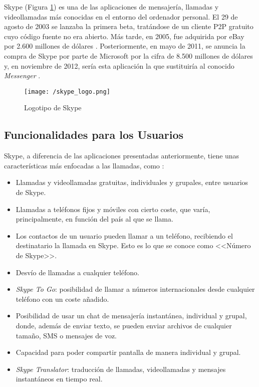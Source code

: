 Skype (Figura \ref{fig:skype}) es una de las aplicaciones de mensajería, llamadas y videollamadas más conocidas en el entorno del ordenador personal.
El 29 de agosto de 2003 se lanzaba la primera beta, tratándose de un cliente \acf{P2P} gratuito cuyo código fuente no era abierto. Más tarde, en 2005, fue adquirida por eBay por 2.600 millones de dólares \cite{Velasco2013}. Posteriormente, en mayo de 2011, se anuncia la compra de Skype por parte de Microsoft por la cifra de 8.500 millones de dólares y, en noviembre de 2012, sería esta aplicación la que sustituiría al conocido \textit{Messenger} \cite{Ramirez2013}.

\begin{figure}[!h]
	\begin{center}
		\texttt{[image: /skype\_logo.png]}
		\caption{Logotipo de Skype}
		\label{fig:skype}
	\end{center}
\end{figure}

\subsection{Funcionalidades para los Usuarios}
Skype, a diferencia de las aplicaciones presentadas anteriormente, tiene unas características más enfocadas a las llamadas, como \cite{Skype2017}:

\begin{itemize}
	\item Llamadas y videollamadas gratuitas, individuales y grupales, entre usuarios de Skype.
	\item Llamadas a teléfonos fijos y móviles con cierto coste, que varía, principalmente, en función del país al que se llama.
	\item Los contactos de un usuario pueden llamar a un teléfono, recibiendo el destinatario la llamada en Skype. Esto es lo que se conoce como <<Número de Skype>>.
	\item Desvío de llamadas a cualquier teléfono.
	\item \textit{Skype To Go}: posibilidad de llamar a números internacionales desde cualquier teléfono con un coste añadido.
	\item Posibilidad de usar un chat de mensajería instantánea, individual y grupal, donde, además de enviar texto, se pueden enviar archivos de cualquier tamaño, \acs{SMS} o mensajes de voz.
	\item Capacidad para poder compartir pantalla de manera individual y grupal.
	\item \textit{Skype Translator}: traducción de llamadas, videollamadas y mensajes instantáneos en tiempo real.
\end{itemize}

